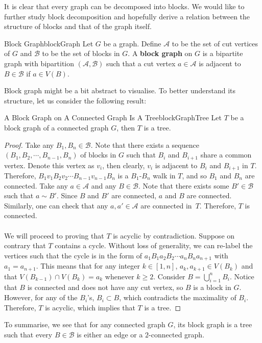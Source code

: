 \documentclass[math]{amznotes}
\theoremstyle{remark}
\begin{document}
It is clear that every graph can be decomposed into blocks. We would like to further study block decomposition and hopefully derive a relation between the structure of blocks and that of the graph itself.
\begin{dfnbox}{Block Graph}{blockGraph}
    Let $G$ be a graph. Define $\mathcal{A}$ to be the set of cut vertices of $G$ and $\mathcal{B}$ to be the set of blocks in $G$. A {\color{red} \textbf{block graph}} on $G$ is a bipartite graph with bipartition $(\mathcal{A}, \mathcal{B})$ such that a cut vertex $a \in \mathcal{A}$ is adjacent to $B \in \mathcal{B}$ if $a \in V(B)$.
\end{dfnbox}
Block graph might be a bit abstract to visualise. To better understand its structure, let us consider the following result:
\begin{probox}{A Block Graph on A Connected Graph Is A Tree}{blockGraphTree}
    Let $T$ be a block graph of a connected graph $G$, then $T$ is a tree.
    \tcblower
    \begin{proof}
        Take any $B_1, B_n \in \mathcal{B}$. Note that there exists a sequence $(B_1, B_{2}, \cdots, B_{n - 1}, B_n)$ of blocks in $G$ such that $B_i$ and $B_{i + 1}$ share a common vertex. Denote this vertex as $v_i$, then clearly, $v_i$ is adjacent to $B_i$ and $B_{i + 1}$ in $T$. Therefore, $B_1v_1B_2v_2\cdots B_{n - 1}v_{n - 1}B_n$ is a $B_1$-$B_n$ walk in $T$, and so $B_1$ and $B_n$ are connected. Take any $a \in \mathcal{A}$ and any $B \in \mathcal{B}$. Note that there exists some $B' \in \mathcal{B}$ such that $a \sim B'$. Since $B$ and $B'$ are connected, $a$ and $B$ are connected. Similarly, one can check that any $a, a' \in \mathcal{A}$ are connected in~$T$. Therefore, $T$ is connected.
        \\\\
        We will proceed to proving that $T$ is acyclic by contradiction. Suppose on contrary that $T$ contains a cycle. Without loss of generality, we can re-label the vertices such that the cycle is in the form of  $a_1B_1a_2B_2\cdots a_nB_na_{n + 1}$ with $a_1 = a_{n + 1}$. This means that for any integer $k \in [1, n]$, $a_k, a_{k + 1} \in V(B_k)$ and that $V(B_{k - 1}) \cap V(B_k) = a_k$ whenever $k \geq 2$. Consider $B = \bigcup_{i = 1}^{n}B_i$. Notice that $B$ is connected and does not have any cut vertex, so $B$ is a block in $G$. However, for any of the $B_i$'s, $B_i \subset B$, which contradicts the maximality of $B_i$. Therefore, $T$ is acyclic, which implies that $T$ is a tree.
    \end{proof}
\end{probox}
To summarise, we see that for any connected graph $G$, its block graph is a tree such that every $B \in \mathcal{B}$ is either an edge or a $2$-connected graph.
\end{document}
